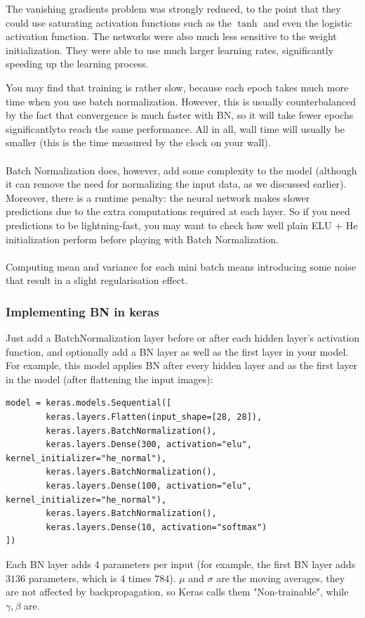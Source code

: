 The vanishing gradients problem was strongly reduced, to the point that they could use saturating activation functions such as the $\tanh$ and even the logistic activation function. The networks were also much less sensitive to the weight initialization. They were able to use much larger learning rates, significantly speeding up the learning process.
 
You may find that training is rather slow, because each epoch takes much more time when you use batch normalization. However, this is usually counterbalanced by the fact that convergence is much faster with BN, so it will take fewer epochs significantlyto reach the same performance. All in all, wall time will usually be smaller (this is the time measured by the clock on your wall). 
 
\paragraph{} Batch Normalization does, however, add some complexity to the model (although it can remove the need for normalizing the input data, as we discussed earlier). Moreover, there is a runtime penalty: the neural network makes slower predictions due to the extra computations required at each layer. So if you need predictions to be lightning-fast, you may want to check how well plain ELU $+$ He initialization perform before playing with Batch Normalization. 

\paragraph{} Computing mean and variance for each mini batch means introducing some noise that result in a slight regularisation effect.

\subsubsection{Implementing BN in keras}
Just add a BatchNormalization layer before or after each hidden layer's activation function, and optionally add a BN layer as well as the first layer in your model. For example, this model applies BN after every hidden layer and as the first layer in the model (after flattening the input images):
\begin{lstlisting}
model = keras.models.Sequential([
        keras.layers.Flatten(input_shape=[28, 28]),
        keras.layers.BatchNormalization(),
        keras.layers.Dense(300, activation="elu", kernel_initializer="he_normal"),
        keras.layers.BatchNormalization(),
        keras.layers.Dense(100, activation="elu", kernel_initializer="he_normal"),
        keras.layers.BatchNormalization(),
        keras.layers.Dense(10, activation="softmax")
])
\end{lstlisting}
Each BN layer adds 4 parameters per input (for example, the first BN layer adds $3136$ parameters, which is 4 times $784$). $\mu$ and $\sigma$ are the moving averages, they are not affected by backpropagation, so Keras calls them "Non-trainable", while $\gamma, \beta$ are.

